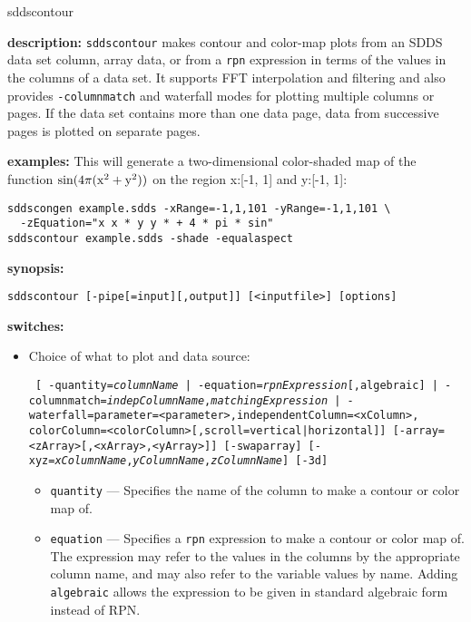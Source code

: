 \begin{sddsprog}{sddscontour}
  \item \textbf{description:}
  \verb|sddscontour| makes contour and color-map plots from an SDDS data set column, array data, or from a \verb|rpn| expression
  in terms of the values in the columns of a data set. It supports FFT interpolation and filtering and also provides
  \verb|-columnmatch| and waterfall modes for plotting multiple columns or pages. If the
  data set contains more than one data page, data from successive pages is plotted on separate pages.

  \item \textbf{examples:}
  This will generate a two-dimensional color-shaded map of the function ${\rm sin(4\pi (x^2 + y^2))}$ on
  the region x:[-1, 1] and y:[-1, 1]:
  \begin{verbatim}
sddscongen example.sdds -xRange=-1,1,101 -yRange=-1,1,101 \
  -zEquation="x x * y y * + 4 * pi * sin"
sddscontour example.sdds -shade -equalaspect
  \end{verbatim}
  \item \textbf{synopsis:}
  \begin{verbatim}
sddscontour [-pipe[=input][,output]] [<inputfile>] [options]
  \end{verbatim}
  \item \textbf{switches:}
    \begin{itemize}
    \item Choice of what to plot and data source:
\begin{flushleft}{\tt
[{ -quantity={\em columnName} | -equation={\em rpnExpression}[,algebraic] |
  -columnmatch={\em indepColumnName},{\em matchingExpression}} |
 -waterfall=parameter=<parameter>,independentColumn=<xColumn>,
             colorColumn=<colorColumn>[,scroll=vertical|horizontal]]
[-array=<zArray>[,<xArray>,<yArray>]] [-swaparray]
[-xyz={\em xColumnName},{\em yColumnName},{\em zColumnName}]
[-3d]
}\end{flushleft}
\begin{itemize}
        \item \verb|quantity| --- Specifies the name of the column to make a contour or color map of.
        \item \verb|equation| --- Specifies a \verb|rpn| expression to make a contour or color map of.
        The expression may refer to the values in the columns by the appropriate column name, and may
        also refer to the variable values by name.  Adding \verb|algebraic| allows the
        expression to be given in standard algebraic form instead of RPN.

\end{itemize}
\end{itemize}
\end{sddsprog}
